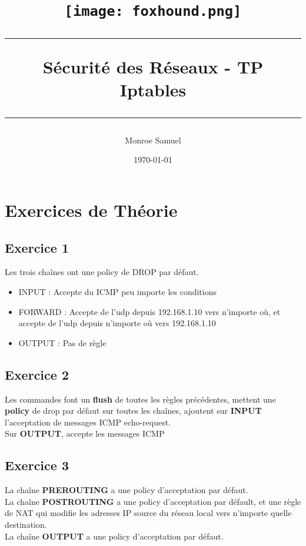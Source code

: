 \documentclass[a4paper,10pt,final,fleqn]{article}
\title{
\parbox{15cm}
{ \texttt{[image: foxhound.png]} \\
  \vspace{3cm}
	\begin{center}\sf\bfseries\Huge
		\rule{15cm}{1pt}
		\medskip
		Sécurité des Réseaux - TP \\
		\huge Iptables
		\vspace{.5cm}
		\rule{15cm}{1pt}
	\end{center}
	\vspace{3cm}
 }}
\author{Monroe Samuel}
\date{\today}
\begin{document}
\maketitle
\newpage

	\section{Exercices de Théorie}

		\subsection{Exercice 1}

			Les trois chaînes ont une policy de DROP par défaut.\\

			\begin{itemize}
				\item INPUT : Accepte du ICMP peu importe les conditions
				\item FORWARD : Accepte de l'udp depuis 192.168.1.10 vers n'importe où, et accepte de l'udp depuis n'importe où vers 192.168.1.10
				\item OUTPUT : Pas de règle
			\end{itemize}

		\subsection{Exercice 2}

			Les commandes font un \textbf{flush} de toutes les règles précédentes, mettent une \textbf{policy} de drop par défaut sur toutes les chaînes, ajoutent sur \textbf{INPUT} l'acceptation de messages ICMP echo-request.\\
			Sur \textbf{OUTPUT}, accepte les messages ICMP

		\subsection{Exercice 3}

			La chaîne \textbf{PREROUTING} a une policy d'acceptation par défaut.\\
			La chaîne \textbf{POSTROUTING} a une policy d'acceptation par défault, et une règle de NAT qui modifie les adresses IP source du réseau local vers n'importe quelle destination.\\
			La chaîne \textbf{OUTPUT} a une policy d'acceptation par défaut.\\
\end{document}
